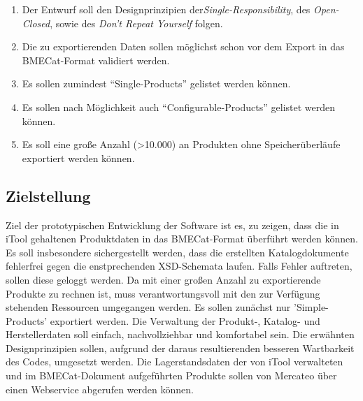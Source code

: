 \begin{enumerate}[noitemsep]
\begin{itemize}[noitemsep]
\begin{itemize}[noitemsep]
				\end{itemize}
			\end{itemize}
		\item Der Entwurf soll den Designprinzipien der\textit{Single-Responsibility}, des \textit{Open-Closed}, sowie des \textit{Don't Repeat Yourself} folgen.
		\item Die zu exportierenden Daten sollen möglichst schon vor dem Export in das BMECat-Format validiert werden.
		\item Es sollen zumindest \enquote{Single-Products} gelistet werden können.
		\item Es sollen nach Möglichkeit auch \enquote{Configurable-Products} gelistet werden können.
		\item Es soll eine große Anzahl (\textgreater 10.000) an Produkten ohne Speicherüberläufe exportiert werden können.
		\end{enumerate}
				 

		
		\subsection{Zielstellung}
		
		Ziel der prototypischen Entwicklung der Software ist es, zu zeigen, dass die in iTool gehaltenen Produktdaten in das BMECat-Format überführt werden können. Es soll insbesondere sichergestellt werden, dass die erstellten Katalogdokumente fehlerfrei gegen die enstprechenden XSD-Schemata laufen. Falls Fehler auftreten, sollen diese geloggt werden. Da mit einer großen Anzahl zu exportierende Produkte zu rechnen ist, muss verantwortungsvoll mit den zur Verfügung stehenden Ressourcen umgegangen werden. Es sollen zunächst nur 'Simple-Products' exportiert werden. Die Verwaltung der Produkt-, Katalog- und Herstellerdaten soll einfach, nachvollziehbar und komfortabel sein. Die erwähnten Designprinzipien sollen, aufgrund der daraus resultierenden besseren Wartbarkeit des Codes, umgesetzt werden. Die Lagerstandsdaten der von iTool verwalteten und im BMECat-Dokument aufgeführten Produkte sollen von Mercateo über einen Webservice abgerufen werden können.
		

